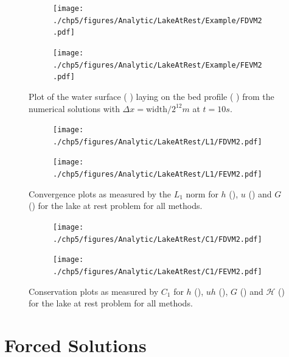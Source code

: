 \begin{figure}
	\centering
	\begin{subfigure}{0.5\textwidth}
		\texttt{[image: ./chp5/figures/Analytic/LakeAtRest/Example/FDVM2.pdf]}
	\end{subfigure}%
	\begin{subfigure}{0.5\textwidth}
		\texttt{[image: ./chp5/figures/Analytic/LakeAtRest/Example/FEVM2.pdf]}
	\end{subfigure}
	\caption{ Plot of the water surface ({\color{blue} \solidrule}) laying on the bed profile ({\color{green!60!black} \solidrule}) from the numerical solutions with $\Delta x = {\text{width}} / {2^{12}}m$ at $t = 10s$.}
	\label{fig:LakeAtRestExAll}
\end{figure}

\begin{figure}
	\centering
	\begin{subfigure}{0.5\textwidth}
		\texttt{[image: ./chp5/figures/Analytic/LakeAtRest/L1/FDVM2.pdf]}
	\end{subfigure}%
	\begin{subfigure}{0.5\textwidth}
		\texttt{[image: ./chp5/figures/Analytic/LakeAtRest/L1/FEVM2.pdf]}
	\end{subfigure}
	\caption{Convergence plots as measured by the $L_1$ norm for $h$ (), $u$ () and $G$ () for the lake at rest problem for all methods.}
	\label{fig:LakeAtRestL1All}
\end{figure}

\begin{figure}
	\centering
	\begin{subfigure}{0.5\textwidth}
		\texttt{[image: ./chp5/figures/Analytic/LakeAtRest/C1/FDVM2.pdf]}
	\end{subfigure}%
	\begin{subfigure}{0.5\textwidth}
		\texttt{[image: ./chp5/figures/Analytic/LakeAtRest/C1/FEVM2.pdf]}
	\end{subfigure}
	\caption{Conservation plots as measured by $C_1$ for $h$ (), $uh$ (), $G$ () and $\mathcal{H}$ () for the lake at rest problem for all methods.}
	\label{fig:LakeAtRestC1All}
\end{figure}

\section{Forced Solutions}

